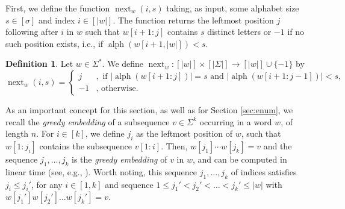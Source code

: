 \documentclass[10pt,a4paper]{amsart}
\DeclareMathOperator{\alphabet}{alph}
\DeclareMathOperator{\nextAlphPos}{next}
\theoremstyle{plain}
\theoremstyle{definition}
\newtheorem{definition}{Definition}
\begin{document}
First, we define the function $\nextAlphPos_w(i, s)$ taking, as input, some alphabet size $s \in [\sigma]$ and index $i \in [\vert w \vert]$. The function returns the leftmost position $j$ following after $i$ in $w$ such that $w[i+1:j]$ contains $s$ distinct letters or $-1$ if no such position exists, i.e., if $\alphabet(w[i + 1, \vert w \vert]) < s$. %
 \begin{definition}
     Let $w\in\Sigma^*$. We define $\nextAlphPos_w : [|w|]\times[|\Sigma|] \rightarrow [|w|]\cup\{-1\}$ by
     $$ \nextAlphPos_w(i,s) = 
     \begin{cases}  
         j   &, \text{ if } |\alphabet(w[i+1:j])| = s \text{ and } |\alphabet(w[i+1:j-1])| < s, \\
         -1  &, \text{ otherwise.}
     \end{cases}$$
 \end{definition}
 
As an important concept for this section, as well as for Section \ref{sec:enum}, we recall the {\em greedy embedding} of a subsequence $v \in \Sigma^k$ occurring in a word $w$, of length $n$. For $i\in [k]$, we define $j_i$ as the leftmost position of $w$, such that $w[1:j_i]$ contains the subsequence $v[1:i]$. Then, $w[j_1]\cdots w[j_k]=v$ and the sequence $j_1,\ldots,j_k$ is the {\em greedy embedding} of $v$ in $w$, and can be computed in linear time (see, e.g., \cite{DBLP:journals/fuin/KoscheKMS22}). Worth noting, this sequence $j_1,\ldots,j_k$ of indices satisfies $j_i \leq j_i'$, for any $i \in [1, k]$ and sequence $1 \leq j_1' < j_2' < \dots < j_k' \leq \vert w \vert$ with $w[j_1'] w[j_2'] \dots w[j_k'] = v$.


\end{document}
